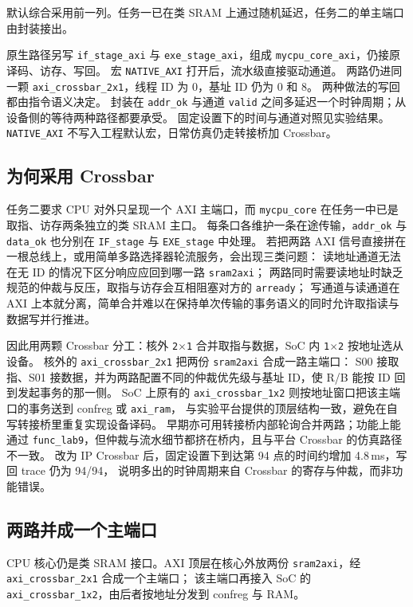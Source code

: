 \documentclass{article}
\begin{document}
默认综合采用前一列。任务一已在类 SRAM 上通过随机延迟，任务二的单主端口由封装接出。

原生路径另写 \texttt{if\_stage\_axi} 与 \texttt{exe\_stage\_axi}，组成 \texttt{mycpu\_core\_axi}，仍接原译码、访存、写回。
宏 \texttt{NATIVE\_AXI} 打开后，流水级直接驱动通道。
两路仍进同一颗 \texttt{axi\_crossbar\_2x1}，线程 ID 为 0，基址 ID 仍为 0 和 8。
两种做法的写回都由指令语义决定。
封装在 \texttt{addr\_ok} 与通道 \texttt{valid} 之间多延迟一个时钟周期；从设备侧的等待两种路径都要承受。
固定设置下的时间与通道对照见实验结果。
\texttt{NATIVE\_AXI} 不写入工程默认宏，日常仿真仍走转接桥加 Crossbar。

\subsection{为何采用 Crossbar}
任务二要求 CPU 对外只呈现一个 AXI 主端口，而 \texttt{mycpu\_core} 在任务一中已是取指、访存两条独立的类 SRAM 主口。
每条口各维护一条在途传输，\texttt{addr\_ok} 与 \texttt{data\_ok} 也分别在 \texttt{IF\_stage} 与 \texttt{EXE\_stage} 中处理。
若把两路 AXI 信号直接拼在一根总线上，或用简单多路选择器轮流服务，会出现三类问题：
读地址通道无法在无 ID 的情况下区分响应应回到哪一路 \texttt{sram2axi}；
两路同时需要读地址时缺乏规范的仲裁与反压，取指与访存会互相阻塞对方的 \texttt{arready}；
写通道与读通道在 AXI 上本就分离，简单合并难以在保持单次传输的事务语义的同时允许取指读与数据写并行推进。

因此用两颗 Crossbar 分工：核外 \texttt{2$\times$1} 合并取指与数据，SoC 内 \texttt{1$\times$2} 按地址选从设备。
核外的 \texttt{axi\_crossbar\_2x1} 把两份 \texttt{sram2axi} 合成一路主端口：
S00 接取指、S01 接数据，并为两路配置不同的仲裁优先级与基址 ID，使 R/B 能按 ID 回到发起事务的那一侧。
SoC 上原有的 \texttt{axi\_crossbar\_1x2} 则按地址窗口把该主端口的事务送到 confreg 或 \texttt{axi\_ram}，
与实验平台提供的顶层结构一致，避免在自写转接桥里重复实现设备译码。
早期亦可用转接桥内部轮询合并两路；功能上能通过 \texttt{func\_lab9}，但仲裁与流水细节都挤在桥内，且与平台 Crossbar 的仿真路径不一致。
改为 IP Crossbar 后，固定设置下到达第 94 点的时间约增加 4.8\,ms，写回 trace 仍为 94/94，
说明多出的时钟周期来自 Crossbar 的寄存与仲裁，而非功能错误。

\subsection{两路并成一个主端口}
CPU 核心仍是类 SRAM 接口。AXI 顶层在核心外放两份 \texttt{sram2axi}，经 \texttt{axi\_crossbar\_2x1} 合成一个主端口；
该主端口再接入 SoC 的 \texttt{axi\_crossbar\_1x2}，由后者按地址分发到 confreg 与 RAM。
\end{document}
